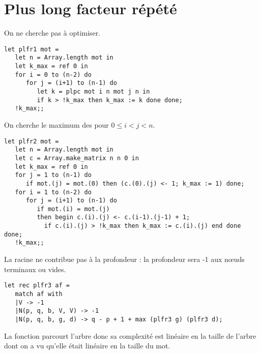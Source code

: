 \section{Plus long facteur répété}
\begin{Exercise}
On ne cherche pas à optimiser.
\begin{lstlisting}
let plfr1 mot =
   let n = Array.length mot in
   let k_max = ref 0 in
   for i = 0 to (n-2) do
      for j = (i+1) to (n-1) do
         let k = plpc mot i n mot j n in
         if k > !k_max then k_max := k done done;
   !k_max;;
\end{lstlisting}
\end{Exercise} 
\begin{Exercise} On cherche le maximum des  pour $0\le i < j < n$.

\begin{lstlisting}
let plfr2 mot =
   let n = Array.length mot in
   let c = Array.make_matrix n n 0 in
   let k_max = ref 0 in
   for j = 1 to (n-1) do
      if mot.(j) = mot.(0) then (c.(0).(j) <- 1; k_max := 1) done;
   for i = 1 to (n-2) do
      for j = (i+1) to (n-1) do
         if mot.(i) = mot.(j)
         then begin c.(i).(j) <- c.(i-1).(j-1) + 1;
           if c.(i).(j) > !k_max then k_max := c.(i).(j) end done done;
   !k_max;;
\end{lstlisting}
\end{Exercise} 
\begin{Exercise}La racine ne contribue pas à la profondeur : la profondeur sera -1 aux nœuds terminaux ou vides.
\begin{lstlisting}
let rec plfr3 af =
   match af with
   |V -> -1
   |N(p, q, b, V, V) -> -1
   |N(p, q, b, g, d) -> q - p + 1 + max (plfr3 g) (plfr3 d);  
\end{lstlisting}
La fonction parcourt l'arbre donc sa complexité est linéaire en la taille de l'arbre dont on a vu qu'elle était linéaire en la taille du mot.
\end{Exercise} 
